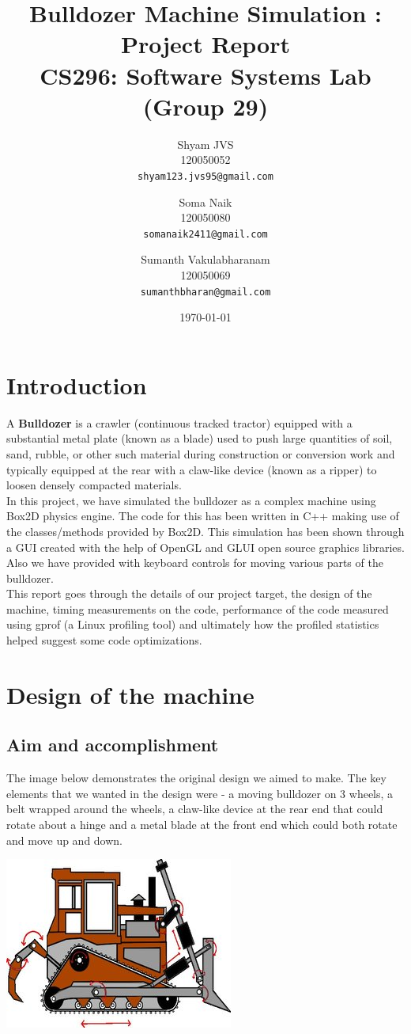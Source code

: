 \documentclass[11pt]{article}
\title{\textbf{Bulldozer Machine Simulation : Project Report} \\ CS296: Software Systems Lab (Group 29)}
\author{
  Shyam JVS\\
  120050052\\
  \texttt{shyam123.jvs95@gmail.com}
  \and
  Soma Naik\\
  120050080\\
  \texttt{somanaik2411@gmail.com}
  \and
  Sumanth Vakulabharanam\\
  120050069\\
  \texttt{sumanthbharan@gmail.com}\\
}
\date{\today}
\begin{document}

\maketitle

\section{Introduction}

A \textbf{Bulldozer} is a crawler (continuous tracked tractor) equipped
with a substantial metal plate (known as a blade) used to push large quantities of soil, sand, rubble, or other such material during construction or conversion work and typically equipped at the rear with a claw-like device (known as a ripper) to loosen densely compacted materials. \cite{wikipedia} \\
In this project, we have simulated the bulldozer as a complex machine using Box2D\cite{box2d} physics engine. The code for this has been written in C++ making use of the classes/methods provided by Box2D. This simulation has been shown through a GUI created with the help of OpenGL and GLUI open source graphics libraries. Also we have provided with keyboard controls for moving various parts of the bulldozer. \\
This report goes through the details of our project target, the design of the machine, timing measurements on the code, performance of the code measured using gprof (a Linux profiling tool) and ultimately how the profiled statistics helped suggest some code optimizations. 

\section{Design of the machine}

\subsection{Aim and accomplishment}
The image below demonstrates the original design we aimed to make. The key elements that we wanted in the design were - a moving bulldozer on 3 wheels, a belt wrapped around the wheels, a claw-like device at the rear end that could rotate about a hinge and a metal blade at the front end which could both rotate and move up and down. 
\begin{center} 
\includegraphics [scale=1.1]{./images/original.jpg} 
\end{center}
\end{document}
